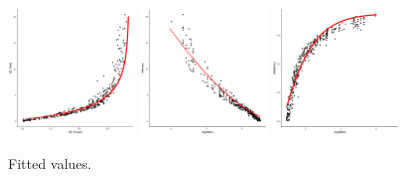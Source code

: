 \documentclass[11pt,letterpaper]{article}
\begin{document}
%
%
%
%
%
%
%

\begin{figure}
\includegraphics[width=0.3\textwidth]{cryptfig/english-info-fitted.pdf}
\includegraphics[width=0.3\textwidth]{cryptfig/english-logbeta-mem-fitted.pdf}
	\includegraphics[width=0.3\textwidth]{cryptfig/english-nlogbeta-ee-fitted.pdf}
	\caption{Fitted values.}\label{fig:eng-pos-fitted}
\end{figure}
\end{document}
